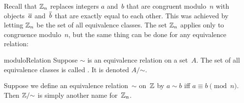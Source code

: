 Recall that $\mathbb{Z}_n$ replaces integers $a$ and~$b$ that are congruent modulo~$n$ with objects~$\overline{a}$ and~$\overline{b}$ that are exactly equal to each other. This was achieved by letting $\mathbb{Z}_n$ be the set of all equivalence classes. The set $\mathbb{Z}_n$ applies only to congruence modulo~$n$, but the same thing can be done for any equivalence relation:

\begin{defn}{moduloRelation}
Suppose $\sim$ is an equivalence relation on a set~$A$. The set of all equivalence classes is called . It is denoted $A/\mathord{\sim}$.
\end{defn}

\begin{example}{}
Suppose we define an equivalence relation~$\sim$ on~$\mathbb{Z}$ by $a \sim b$ iff $a \equiv b \pmod{n}$. Then $\mathbb{Z}/\mathord{\sim}$ is simply another name for~$\mathbb{Z}_n$.
\end{example}


%
%
%

